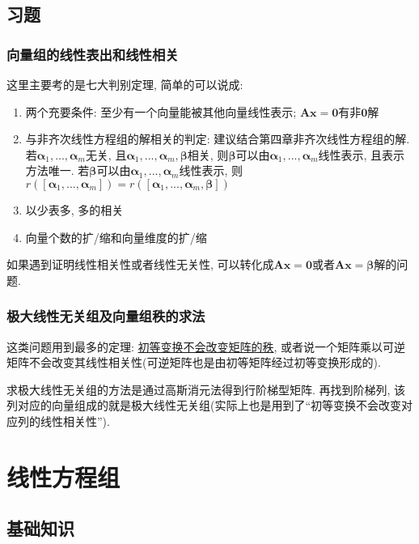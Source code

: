 \section{习题}
\subsection{向量组的线性表出和线性相关}
这里主要考的是七大判别定理, 简单的可以说成:
\begin{enumerate}
\item 两个充要条件: 至少有一个向量能被其他向量线性表示; $ \bm{A}\bm{x}=\bm{0} $有非$ \bm{0} $解
\item 与非齐次线性方程组的解相关的判定: 建议结合第四章非齐次线性方程组的解. 若$ \bm{\alpha}_{1},...,\bm{\alpha}_{m} $无关, 且$ \bm{\alpha}_{1},...,\bm{\alpha}_{m},\bm{\beta} $相关, 则$ \bm{\beta} $可以由$ \bm{\alpha}_{1},...,\bm{\alpha}_{m} $线性表示, 且表示方法唯一. 若$ \bm{\beta} $可以由$ \bm{\alpha}_{1},...,\bm{\alpha}_{m} $线性表示, 则$ r([\bm{\alpha}_{1},...,\bm{\alpha}_{m}])=r([\bm{\alpha}_{1},...,\bm{\alpha}_{m},\bm{\beta}]) $
\item 以少表多, 多的相关
\item 向量个数的扩/缩和向量维度的扩/缩
\end{enumerate}\par
如果遇到证明线性相关性或者线性无关性, 可以转化成$ \bm{A}\bm{x}=\bm{0} $或者$ \bm{A}\bm{x}=\bm{\beta} $解的问题.
\subsection{极大线性无关组及向量组秩的求法}
这类问题用到最多的定理: \hyperref[初等变换不会改变矩阵的秩]{初等变换不会改变矩阵的秩}, 或者说一个矩阵乘以可逆矩阵不会改变其线性相关性(可逆矩阵也是由初等矩阵经过初等变换形成的). \par \vspace{.5em}求极大线性无关组的方法是通过高斯消元法得到行阶梯型矩阵. 再找到阶梯列, 该列对应的向量组成的就是极大线性无关组(实际上也是用到了``初等变换不会改变对应列的线性相关性'').
\chapter{线性方程组}
\section{基础知识}
